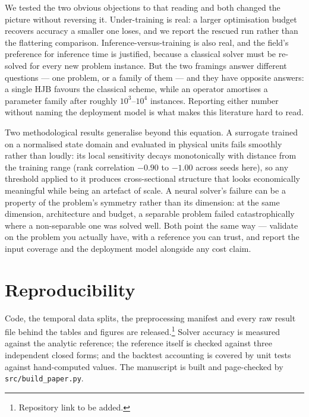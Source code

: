 \documentclass[conference]{IEEEtran}
\begin{document}
We tested the two obvious objections to that reading and both changed the picture without
reversing it. Under-training is real: a larger optimisation budget recovers accuracy a smaller one
loses, and we report the rescued run rather than the flattering comparison. Inference-versus-training
is also real, and the field's preference for inference time is justified, because a classical
solver must be re-solved for every new problem instance. But the two framings answer different
questions --- one problem, or a family of them --- and they have opposite answers: a single HJB
favours the classical scheme, while an operator amortises a parameter family after roughly
$10^3$--$10^4$ instances. Reporting either number without naming the deployment model is what makes
this literature hard to read.

Two methodological results generalise beyond this equation. A surrogate trained on a normalised
state domain and evaluated in physical units fails smoothly rather than loudly: its local
sensitivity decays monotonically with distance from the training range (rank correlation $-0.90$
to $-1.00$ across seeds here), so any threshold applied to it produces cross-sectional structure
that looks economically meaningful while being an artefact of scale. A neural solver's failure
can be a property of the problem's symmetry rather than its dimension: at the same dimension,
architecture and budget, a separable problem failed catastrophically where a non-separable one was
solved well. Both point the same way --- validate on the problem you actually have, with a
reference you can trust, and report the input coverage and the deployment model alongside any cost
claim.

\section*{Reproducibility}
Code, the temporal data splits, the preprocessing manifest and every raw result file behind the
tables and figures are released.\footnote{Repository link to be added.} Solver accuracy is
measured against the analytic reference; the reference itself is checked against three
independent closed forms; and the backtest accounting is covered by unit tests against
hand-computed values. The manuscript is built and page-checked by \texttt{src/build\_paper.py}.



\end{document}
